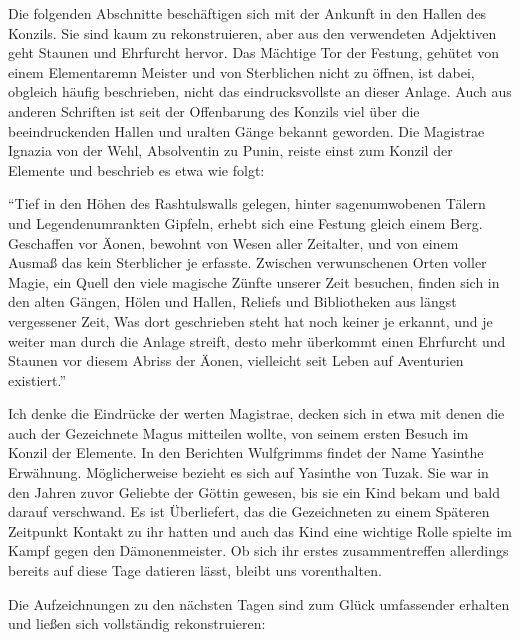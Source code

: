 Die folgenden Abschnitte beschäftigen sich mit der Ankunft in den Hallen des Konzils. Sie sind kaum zu rekonstruieren, aber aus den verwendeten Adjektiven geht Staunen und Ehrfurcht hervor. Das Mächtige Tor der Festung, gehütet von einem Elementaremn Meister und von Sterblichen nicht zu öffnen, ist dabei, obgleich häufig beschrieben, nicht das eindrucksvollste an dieser Anlage. Auch aus anderen Schriften ist seit der Offenbarung des Konzils viel über die beeindruckenden Hallen und uralten Gänge bekannt geworden. Die Magistrae Ignazia von der Wehl, Absolventin zu Punin, reiste einst zum Konzil der Elemente und beschrieb es etwa wie folgt:

``Tief in den Höhen des Rashtulswalls gelegen, hinter sagenumwobenen Tälern und Legendenumrankten Gipfeln, erhebt sich eine Festung gleich einem Berg. Geschaffen vor Äonen, bewohnt von Wesen aller Zeitalter, und von einem Ausmaß das kein Sterblicher je erfasste. Zwischen verwunschenen Orten voller Magie, ein Quell den viele magische Zünfte unserer Zeit besuchen, finden sich in den alten Gängen, Hölen und Hallen, Reliefs und Bibliotheken aus längst vergessener Zeit, Was dort geschrieben steht hat noch keiner je erkannt, und je weiter man durch die Anlage streift, desto mehr überkommt einen Ehrfurcht und Staunen vor diesem Abriss der Äonen, vielleicht seit Leben auf Aventurien existiert.''

Ich denke die Eindrücke der werten Magistrae, decken sich in etwa mit denen die auch der Gezeichnete Magus mitteilen wollte, von seinem ersten Besuch im Konzil der Elemente. In den Berichten Wulfgrimms findet der Name Yasinthe Erwähnung. Möglicherweise bezieht es sich auf Yasinthe von Tuzak. Sie war in den Jahren zuvor Geliebte der Göttin gewesen, bis sie ein Kind bekam und bald darauf verschwand. Es ist Überliefert, das die Gezeichneten zu einem Späteren Zeitpunkt Kontakt zu ihr hatten und auch das Kind eine wichtige Rolle spielte im Kampf gegen den Dämonenmeister. Ob sich ihr erstes zusammentreffen allerdings bereits auf diese Tage datieren lässt, bleibt uns vorenthalten.

Die Aufzeichnungen zu den nächsten Tagen sind zum Glück umfassender erhalten und ließen sich vollständig rekonstruieren:

